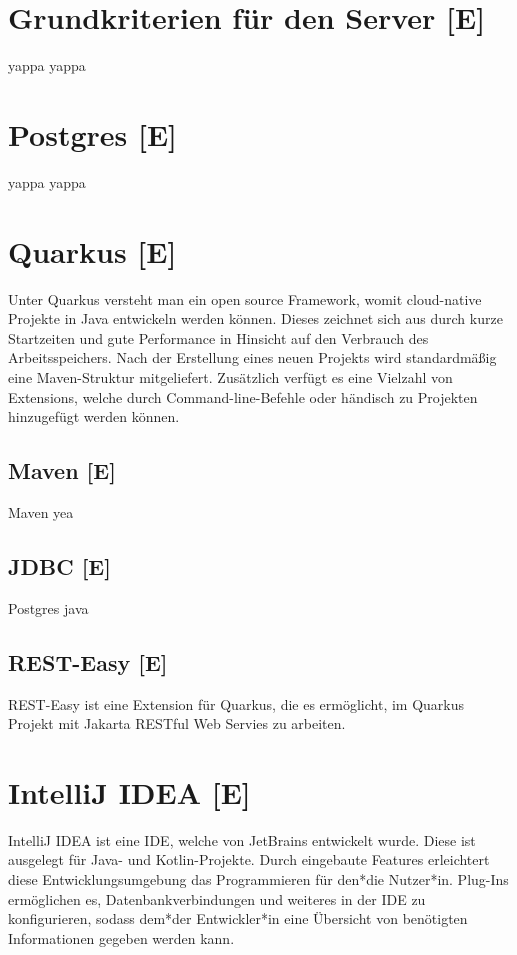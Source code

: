 \section{Grundkriterien für den Server [E]}
yappa yappa

\section{Postgres [E]}
yappa yappa

\section{Quarkus [E]}
Unter Quarkus versteht man ein open source Framework, womit cloud-native Projekte in Java entwickeln werden können. 
Dieses zeichnet sich aus durch kurze Startzeiten und gute Performance in Hinsicht auf den Verbrauch des Arbeitsspeichers. 
Nach der Erstellung eines neuen Projekts wird standardmäßig eine Maven-Struktur mitgeliefert.
Zusätzlich verfügt es eine Vielzahl von Extensions, welche durch Command-line-Befehle oder händisch zu Projekten hinzugefügt werden können.
\cite{QuarkusAbout, QuarkusFirstApplication}

\subsection{Maven [E]}
Maven yea

\subsection{JDBC [E]}
Postgres java

\subsection{REST-Easy [E]}
REST-Easy ist eine Extension für Quarkus, die es ermöglicht, im Quarkus Projekt mit Jakarta RESTful Web Servies zu arbeiten. 


\section{IntelliJ IDEA [E]}
IntelliJ IDEA ist eine IDE, welche von JetBrains entwickelt wurde. Diese ist ausgelegt für Java- und Kotlin-Projekte. 
Durch eingebaute Features erleichtert diese Entwicklungsumgebung das Programmieren für den*die Nutzer*in. 
Plug-Ins ermöglichen es, Datenbankverbindungen und weiteres in der IDE zu konfigurieren, sodass dem*der Entwickler*in eine Übersicht von benötigten Informationen gegeben werden kann.
\cite{IntelliJIDEA}

